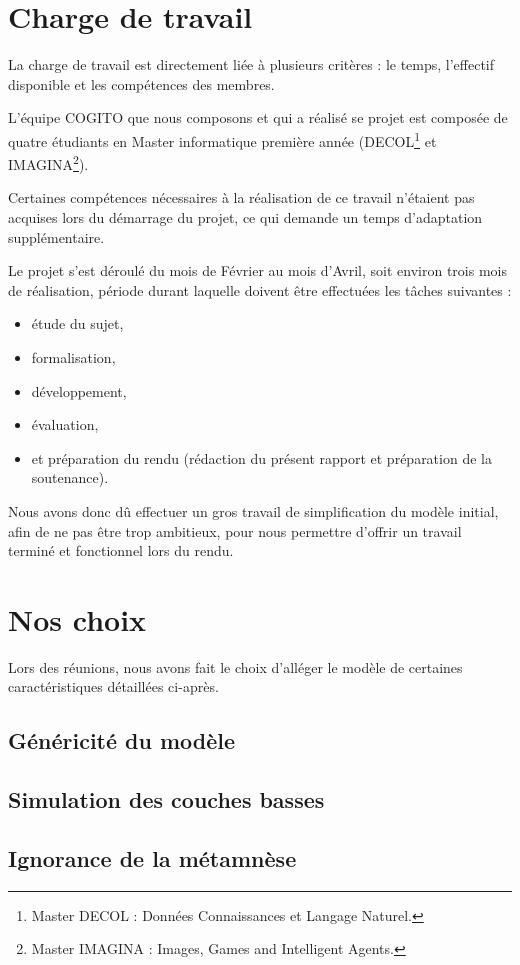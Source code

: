 \section{Charge de travail}
La charge de travail est directement liée à plusieurs critères : le temps,
l'effectif disponible et les compétences des membres.

L'équipe COGITO que nous composons et qui a réalisé se projet est composée de
quatre étudiants en Master informatique première année (DECOL\footnote{Master
DECOL : Données Connaissances et Langage Naturel.} et IMAGINA\footnote{Master
IMAGINA : Images, Games and Intelligent Agents.}).

Certaines compétences nécessaires à la réalisation de ce travail n'étaient pas
acquises lors du démarrage du projet, ce qui demande un temps d'adaptation
supplémentaire.

Le projet s'est déroulé du mois de Février au mois d'Avril, soit environ trois
mois de réalisation, période durant laquelle doivent être effectuées les tâches
suivantes :

\begin{itemize}
\item étude du sujet, 
\item formalisation, 
\item développement, 
\item évaluation,
\item et préparation du rendu (rédaction du présent rapport et préparation de la soutenance).
\end{itemize}

Nous avons donc dû effectuer un gros travail de simplification du modèle
initial, afin de ne pas être trop ambitieux, pour nous permettre d'offrir un
travail terminé et fonctionnel lors du rendu.

\section{Nos choix}

Lors des réunions, nous avons fait le choix d'alléger le modèle de certaines caractéristiques détaillées ci-après.

\subsection{Généricité du modèle}
\subsection{Simulation des couches basses}
\subsection{Ignorance de la métamnèse}